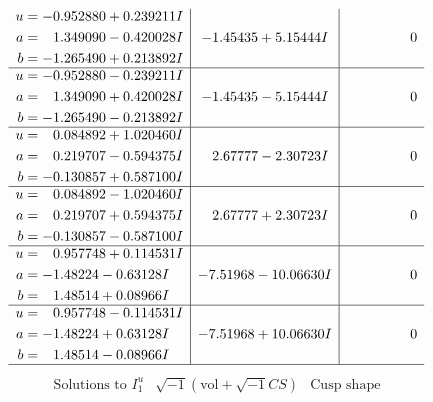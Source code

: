 \documentclass[1p]{elsarticle_modified}
\theoremstyle{definition}
\newcommand{\I}{\sqrt{-1}}
\begin{document}
$$\begin{array}{c|c|c}
\begin{aligned}
u &= -0.952880 + 0.239211 I \\
a &= \phantom{-}1.349090 - 0.420028 I \\
b &= -1.265490 + 0.213892 I\end{aligned}
 & -1.45435 + 5.15444 I & \phantom{-0.000000 } 0 \\ \hline\begin{aligned}
u &= -0.952880 - 0.239211 I \\
a &= \phantom{-}1.349090 + 0.420028 I \\
b &= -1.265490 - 0.213892 I\end{aligned}
 & -1.45435 - 5.15444 I & \phantom{-0.000000 } 0 \\ \hline\begin{aligned}
u &= \phantom{-}0.084892 + 1.020460 I \\
a &= \phantom{-}0.219707 - 0.594375 I \\
b &= -0.130857 + 0.587100 I\end{aligned}
 & \phantom{-}2.67777 - 2.30723 I & \phantom{-0.000000 } 0 \\ \hline\begin{aligned}
u &= \phantom{-}0.084892 - 1.020460 I \\
a &= \phantom{-}0.219707 + 0.594375 I \\
b &= -0.130857 - 0.587100 I\end{aligned}
 & \phantom{-}2.67777 + 2.30723 I & \phantom{-0.000000 } 0 \\ \hline\begin{aligned}
u &= \phantom{-}0.957748 + 0.114531 I \\
a &= -1.48224 - 0.63128 I \\
b &= \phantom{-}1.48514 + 0.08966 I\end{aligned}
 & -7.51968 - 10.06630 I & \phantom{-0.000000 } 0 \\ \hline\begin{aligned}
u &= \phantom{-}0.957748 - 0.114531 I \\
a &= -1.48224 + 0.63128 I \\
b &= \phantom{-}1.48514 - 0.08966 I\end{aligned}
 & -7.51968 + 10.06630 I & \phantom{-0.000000 } 0\\
 \hline 
 \end{array}$$\newpage$$\begin{array}{c|c|c}  
\text{Solutions to }I^u_{1}& \I (\text{vol} + \sqrt{-1}CS) & \text{Cusp shape}\\
 \hline 
\begin{aligned}

\end{aligned}
\end{array}$$
\end{document}

